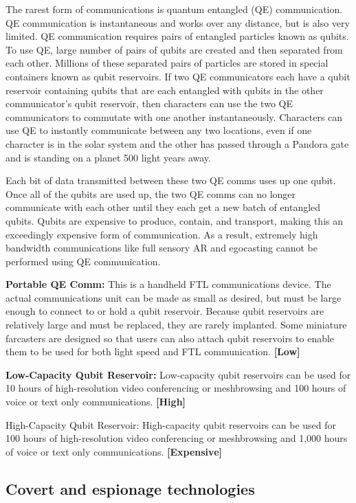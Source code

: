 The rarest form of communications is quantum entangled (QE) communication. QE communication is instantaneous and works over any distance, but is also very limited. QE communication requires pairs of entangled particles known as qubits. To use QE, large number of pairs of qubits are created and then separated from each other. Millions of these separated pairs of particles are stored in special containers known as qubit reservoirs. If two QE communicators each have a qubit reservoir containing qubits that are each entangled with qubits in the other communicator’s qubit reservoir, then characters can use the two QE communicators to commutate with one another instantaneously. Characters can use QE to instantly communicate between any two locations, even if one character is in the solar system and the other has passed through a Pandora gate and is standing on a planet 500 light years away.

Each bit of data transmitted between these two QE comms uses up one qubit. Once all of the qubits are used up, the two QE comms can no longer communicate with each other until they each get a new batch of entangled qubits. Qubits are expensive to produce, contain, and transport, making this an exceedingly expensive form of communication. As a result, extremely high bandwidth communications like full sensory AR and egocasting cannot be performed using QE communication.

\textbf{Portable QE Comm:} This is a handheld FTL communications device. The actual communications unit can be made as small as desired, but must be large enough to connect to or hold a qubit reservoir. Because qubit reservoirs are relatively large and must be replaced, they are rarely implanted. Some miniature farcasters are designed so that users can also attach qubit reservoirs to enable them to be used for both light speed and FTL communication. \textbf{[Low]}

\textbf{Low-Capacity Qubit Reservoir:} Low-capacity qubit reservoirs can be used for 10 hours of high-resolution video conferencing or meshbrowsing and 100 hours of voice or text only communications. \textbf{[High]}

High-Capacity Qubit Reservoir: High-capacity qubit reservoirs can be used for 100 hours of high-resolution video conferencing or meshbrowsing and 1,000 hours of voice or text only communications. \textbf{[Expensive]}


\subsection{Covert and espionage technologies}
\label{sec:covert-espionage-tech}

